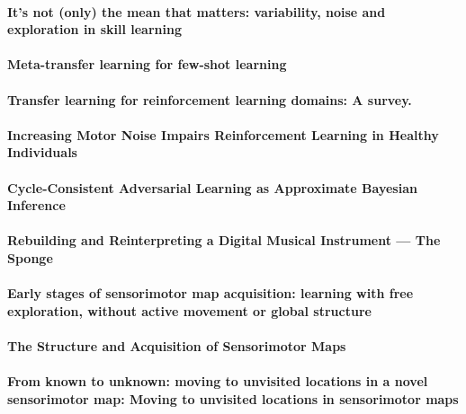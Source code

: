 \documentclass[11pt]{article}
\begin{document}
\paragraph{It's not (only) the mean that matters: variability, noise and exploration in skill learning} \citep{sternad_its_2018}


\paragraph{Meta-transfer learning for few-shot learning} \citep{sun_meta-transfer_2019}


\paragraph{Transfer learning for reinforcement learning domains: A survey.} \citep{taylor_transfer_2009}


\paragraph{Increasing Motor Noise Impairs Reinforcement Learning in Healthy Individuals} \citep{therrien_increasing_2018}


\paragraph{Cycle-Consistent Adversarial Learning as Approximate Bayesian Inference} \citep{tiao_cycle-consistent_2018}


\paragraph{Rebuilding and Reinterpreting a Digital Musical Instrument — The Sponge} \citep{tom_rebuilding_2019}


\paragraph{Early stages of sensorimotor map acquisition: learning with free exploration, without active movement or global structure} \citep{van_vugt_early_2019}


\paragraph{The Structure and Acquisition of Sensorimotor Maps} \citep{van_vugt_structure_2018}


\paragraph{From known to unknown: moving to unvisited locations in a novel sensorimotor map: Moving to unvisited locations in sensorimotor maps} \citep{van_vugt_known_2018}
\end{document}
